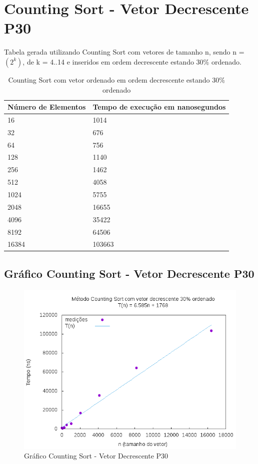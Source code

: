 \documentclass[12pt,a4paper,twoside]{report}
\begin{document}
\section{Counting Sort - Vetor Decrescente P30}
Tabela gerada utilizando Counting Sort com vetores de tamanho n, sendo n = $(2^k)$, de k = 4..14 e inseridos em ordem decrescente estando 30\% ordenado.
\begin{table}[H]
\centering
\caption{Counting Sort com vetor ordenado em ordem decrescente estando 30\% ordenado}
\label{my-label}
\begin{tabular}{|l|l|}
\hline
\multicolumn{1}{|c|}{\textbf{Número de Elementos}} & \multicolumn{1}{c|}{\textbf{Tempo de execução em nanosegundos}} \\ \hline
16 & 1014 \\ \hline
32 & 676 \\ \hline
64 & 756 \\ \hline
128 & 1140 \\ \hline
256 & 1462 \\ \hline
512 & 4058 \\ \hline
1024 & 5755 \\ \hline
2048 & 16655 \\ \hline
4096 & 35422 \\ \hline
8192 & 64506 \\ \hline
16384 & 103663 \\ \hline
\end{tabular}
\end{table}

\subsection{Gráfico Counting Sort - Vetor Decrescente P30}
\begin{figure}[H]
    \centering
    \includegraphics[width=0.7\linewidth]{graficos/CountingSort/vIntDecrescenteP30/vIntDecrescenteP30.png}
  \caption{Gráfico Counting Sort - Vetor Decrescente P30}
\end{figure}
\end{document}
